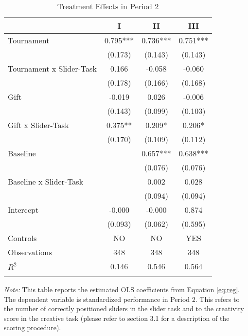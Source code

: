 \begin{table}[h]%
\setlength\tabcolsep{2pt}
\caption{Treatment Effects in Period 2}
\begin{center}%
{\small\renewcommand{\arraystretch}{1}%
\begin{tabular}{lccc}
\hline\hline\noalign{\smallskip}
 & I & II & III \\
\hline\noalign{\smallskip}
Tournament          &       0.795***&       0.736***&       0.751***\\
                    &     (0.173)   &     (0.143)   &     (0.143)   \\[2mm]
Tournament x Slider-Task&       0.166   &      -0.058   &      -0.060   \\
                    &     (0.178)   &     (0.166)   &     (0.168)   \\[2mm]
Gift                &      -0.019   &       0.026   &      -0.006   \\
                    &     (0.143)   &     (0.099)   &     (0.103)   \\[2mm]
Gift x Slider-Task  &       0.375** &       0.209*  &       0.206*  \\
                    &     (0.170)   &     (0.109)   &     (0.112)   \\[2mm]
Baseline            &               &       0.657***&       0.638***\\
                    &               &     (0.076)   &     (0.076)   \\[2mm]
Baseline x Slider-Task&               &       0.002   &       0.028   \\
                    &               &     (0.094)   &     (0.094)   \\[2mm]
Intercept           &      -0.000   &      -0.000   &       0.874   \\
                    &     (0.093)   &     (0.062)   &     (0.595)   \\[2mm]
\noalign{\smallskip}\hline
 Controls & NO & NO & YES \\
\hline
Observations        &         348   &         348   &         348   \\
$R^2$               &       0.146   &       0.546   &       0.564   \\
\hline\hline\noalign{\medskip}
\end{tabular}}
\begin{minipage}{\textwidth}
\footnotesize {\it Note:} This table reports the estimated OLS coefficients from Equation \ref{eq:reg}. 
 The dependent variable is standardized performance in Period 2. This refers to the number of correctly positioned sliders in the slider task and to the creativity score in the creative task (please refer to section 3.1 for a description of the scoring procedure). 

\end{minipage}
\end{center}
\end{table}
